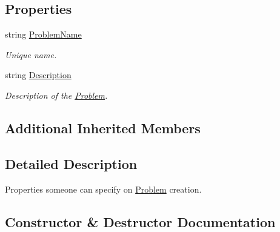 \subsection*{Properties}
\begin{DoxyCompactItemize}
\item 
string \mbox{\hyperlink{class_code_a_friend_1_1_data_model_1_1_user_1_1_add_problem_command_a6ca5b8a127f410eba3760e4959cca6f4}{Problem\+Name}}
\begin{DoxyCompactList}\small\item\em Unique name.\end{DoxyCompactList}\item 
string \mbox{\hyperlink{class_code_a_friend_1_1_data_model_1_1_user_1_1_add_problem_command_a84d349b14a1f61a242347a617c57dbfd}{Description}}
\begin{DoxyCompactList}\small\item\em Description of the \mbox{\hyperlink{class_code_a_friend_1_1_data_model_1_1_problem}{Problem}}.\end{DoxyCompactList}\end{DoxyCompactItemize}
\subsection*{Additional Inherited Members}


\subsection{Detailed Description}
Properties someone can specify on \mbox{\hyperlink{class_code_a_friend_1_1_data_model_1_1_problem}{Problem}} creation.



\subsection{Constructor \& Destructor Documentation}
\mbox{\label{class_code_a_friend_1_1_data_model_1_1_user_1_1_add_problem_command_ab1882e37c8dc3be58d4ac74f80925407}} 
